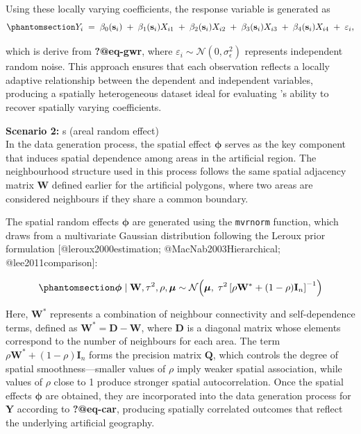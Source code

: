 \documentclass[
  letterpaper,
  DIV=11,
  numbers=noendperiod]{scrartcl}
\begin{document}
Using these locally varying coefficients, the response variable is
generated as \begin{equation}\phantomsection\label{eq-gwrgdp}{
Y_i \;=\; \beta_0(\mathbf{s}_i)
\;+\; \beta_1(\mathbf{s}_i) X_{i1}
\;+\; \beta_2(\mathbf{s}_i) X_{i2}
\;+\; \beta_3(\mathbf{s}_i) X_{i3}
\;+\; \beta_4(\mathbf{s}_i) X_{i4}
\;+\; \varepsilon_i,
}\end{equation}

which is derive from \textbf{?@eq-gwr}, where
\(\varepsilon_i \sim \mathcal{N}(0, \sigma_{\epsilon}^2)\) represents
independent random noise. This approach ensures that each observation
reflects a locally adaptive relationship between the dependent and
independent variables, producing a spatially heterogeneous dataset ideal
for evaluating 's ability to recover spatially varying
coefficients.

\textbf{Scenario 2:}  s (areal random effect)\\
In the  data generation process, the spatial effect
\(\boldsymbol{\phi}\) serves as the key component that induces spatial
dependence among areas in the artificial region. The neighbourhood
structure used in this process follows the same spatial adjacency matrix
\(\mathbf{W}\) defined earlier for the artificial polygons, where two
areas are considered neighbours if they share a common boundary.

The spatial random effects \(\boldsymbol{\phi}\) are generated using the
\texttt{mvrnorm} function, which draws from a multivariate Gaussian
distribution following the Leroux prior formulation
{[}@leroux2000estimation; @MacNab2003Hierarchical;
@lee2011comparison{]}:

\begin{equation}\phantomsection\label{eq-lerouxjoint}{
\boldsymbol{\phi} \mid \mathbf{W}, \tau^2, \rho, \boldsymbol{\mu}
\sim \mathcal{N}\!\left(
\boldsymbol{\mu},\;
\tau^2 \left[ \rho \mathbf{W}^* + (1 - \rho)\mathbf{I}_n \right]^{-1}
\right)
}\end{equation}

Here, \(\mathbf{W}^*\) represents a combination of neighbour
connectivity and self-dependence terms, defined as
\(\mathbf{W}^* = \mathbf{D} - \mathbf{W}\), where \(\mathbf{D}\) is a
diagonal matrix whose elements correspond to the number of neighbours
for each area. The term \(\rho \mathbf{W}^* + (1 - \rho)\mathbf{I}_n\)
forms the precision matrix \(\mathbf{Q}\), which controls the degree of
spatial smoothness---smaller values of \(\rho\) imply weaker spatial
association, while values of \(\rho\) close to 1 produce stronger
spatial autocorrelation. Once the spatial effects \(\boldsymbol{\phi}\)
are obtained, they are incorporated into the data generation process for
\(\mathbf{Y}\) according to \textbf{?@eq-car}, producing spatially
correlated outcomes that reflect the underlying artificial geography.
\end{document}

